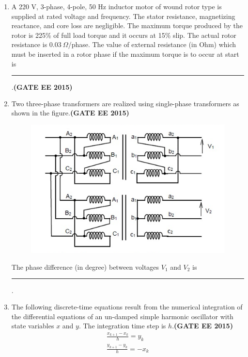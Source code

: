 \documentclass[a4paper,12pt]{exam}
\theoremstyle{remark}
\begin{document}
\begin{enumerate}
\item A 220 V, 3-phase, 4-pole, 50 Hz inductor motor of wound rotor type is supplied at rated voltage and frequency. The stator resistance, magnetizing reactance, and core loss are negligible. The maximum torque produced by the rotor is 225\% of full load torque and it occurs at 15\% slip. The actual rotor resistance is $0.03~\Omega$/phase. The value of external resistance (in Ohm) which must be inserted in a rotor phase if the maximum torque is to occur at start is \rule{3cm}{0.15mm}.\hfill{\textbf{(GATE EE 2015)}}

\item Two three-phase transformers are realized using single-phase transformers as shown in the figure.\hfill{\textbf{(GATE EE 2015)}}
\begin{figure}[H]
    \centering
    \includegraphics[width=0.75\columnwidth]{figs/2Q 61.png}
    \caption{}
    \label{fig:placeholder}
\end{figure}
 The phase difference (in degree) between voltages $V_1$ and $V_2$ is \rule{3cm}{0.15mm}.
\item The following discrete-time equations result from the numerical integration of the differential equations of an un-damped simple harmonic oscillator with state variables $x$ and $y$. The integration time step is $h$.\hfill{\textbf{(GATE EE 2015)}}
\begin{align}
  \frac{x_{k+1} - x_k}{h} = y_k\\
\frac{y_{k+1} - y_k}{h} = -x_k
\end{align}


\end{enumerate}
\end{document}

